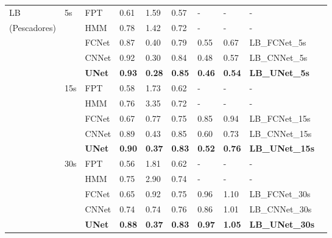 \documentclass{article}
\begin{document}
\begin{table}[h]
\begin{tabular}{llllllllll}
    \midrule
    LB        & 5s  & FPT    & 0.61 & 1.59 & 0.57 & - & - & - \\
(Pescadores) &     & HMM    & 0.78 & 1.42 & 0.72 & - & - & - \\
             &     & FCNet  & 0.87 & 0.40 & 0.79 & 0.55 & 0.67 & LB\_FCNet\_5s \\
             &     & CNNet  & 0.92 & 0.30 & 0.84 & 0.48 & 0.57 & LB\_CNNet\_5s \\
             &     & {\bf UNet} & {\bf 0.93} & {\bf 0.28} & {\bf 0.85} & {\bf 0.46} & {\bf 0.54} & {\bf LB\_UNet\_5s} \\
             & 15s & FPT    & 0.58 & 1.73 & 0.62 & - & - & - \\
             &     & HMM    & 0.76 & 3.35 & 0.72 & - & - & - \\
             &     & FCNet  & 0.67 & 0.77 & 0.75 & 0.85 & 0.94 & LB\_FCNet\_15s \\
             &     & CNNet  & 0.89 & 0.43 & 0.85 & 0.60 & 0.73 & LB\_CNNet\_15s \\
             &     & {\bf UNet} & {\bf 0.90} & {\bf 0.37} & {\bf 0.83} & {\bf 0.52}& {\bf 0.76} & {\bf LB\_UNet\_15s} \\
             & 30s & FPT    & 0.56 & 1.81 & 0.62 & - & - & - \\
             &     & HMM    & 0.75 & 2.90 & 0.74 & - & - & - \\
             &     & FCNet  & 0.65 & 0.92 & 0.75 & 0.96 & 1.10 & LB\_FCNet\_30s \\
             &     & CNNet  & 0.74 & 0.74 & 0.76 & 0.86 & 1.01 & LB\_CNNet\_30s\\
             &     & {\bf UNet} & {\bf 0.88} & {\bf 0.37} & {\bf 0.83} & {\bf 0.97} & {\bf 1.05} & {\bf LB\_UNet\_30s} \\
    \bottomrule
  \end{tabular}
  \label{table_training}
\end{table}
\end{document}
